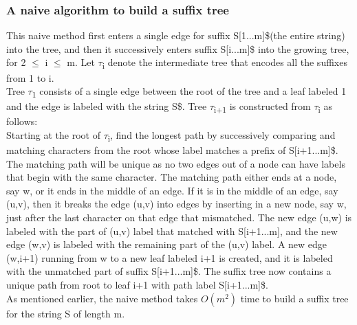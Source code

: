 \documentclass[11pt,a4paper]{article}
\begin{document}
\subsubsection{A naive algorithm to build a suffix tree}
\label{subsec:naivealgorithm}
This naive method first enters a single edge for suffix S[1...m]\$(the entire string) into the tree, and then it successively enters suffix S[i...m]\$ into the growing tree, for 2 $\le$ i $\le$ m. Let \begin{math}\tau\end{math}\textsubscript{i} denote the intermediate tree that encodes all the suffixes from 1 to i. 
\\
Tree \begin{math}\tau\end{math}\textsubscript{1} consists of a single edge between the root of the tree and a leaf labeled 1 and the edge is labeled with the string S\$. Tree \begin{math}\tau\end{math}\textsubscript{i+1} is constructed from \begin{math}\tau\end{math}\textsubscript{i} as follows:
\\
Starting at the root of \begin{math}\tau\end{math}\textsubscript{i}, find the longest path by successively comparing and matching characters from the root whose label matches a prefix of S[i+1...m]\$. The matching path will be unique as no two edges out of a node can have labels that begin with the same character. The matching path either ends at a node, say w, or it ends in the middle of an edge. If it is in the middle of an edge, say (u,v), then it breaks the edge (u,v) into edges by inserting in a new node, say w, just after the last character on that edge that mismatched. The new edge (u,w) is labeled with the part of (u,v) label that matched with S[i+1...m], and the new edge (w,v) is labeled with the remaining part of the (u,v) label. A new edge (w,i+1) running from w to a new leaf labeled i+1 is created, and it is labeled with the unmatched part of suffix S[i+1...m]\$. The suffix tree now contains a unique path from root to leaf i+1 with path label S[i+1...m]\$.
\\
As mentioned earlier, the naive method takes \begin{math}O(m^2)\end{math}
time to build a suffix tree for the string S of length m.
\end{document}
